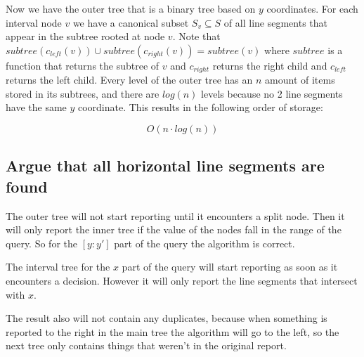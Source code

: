 \documentclass{article}
\begin{document}
Now we have the outer tree that is a binary tree based on $y$ coordinates.
For each interval node $v$ we have a canonical subset $S_v \subseteq S$
of all line segments that appear in the subtree rooted at node $v$.
Note that $subtree(c_{left}(v))\cup subtree(c_{right}(v)) = subtree(v)$
where $subtree$ is a function that returns the subtree of $v$ and 
$c_{right}$ returns the right child and $c_{left}$ returns the left child.
Every level of the outer tree has an $n$ amount of items stored in its
subtrees, and there are $log(n)$ levels because no 2 line segments have the
same $y$ coordinate. This results in the following order of storage:

\[ O(n \cdot log(n))\]


\subsection{Argue that all horizontal line segments are found}
The outer tree will not start reporting until it encounters a
split node. Then it will only report the inner tree if the
value of the nodes fall in the range of the query. So for
the $[y:y']$ part of the query the algorithm is correct.

The interval tree for the $x$ part of the query will start
reporting as soon as it encounters a decision. However it
will only report the line segments that intersect with $x$.

The result also will not contain any duplicates, because
when something is reported to the right in the main tree
the algorithm will go to the left, so the next tree only
contains things that weren't in the original report.
\end{document}
